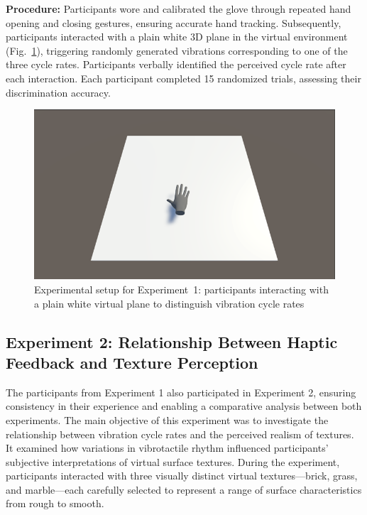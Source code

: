 \textbf{Procedure:} Participants wore and calibrated the glove through repeated hand opening and closing gestures, ensuring accurate hand tracking. Subsequently, participants interacted with a plain white 3D plane in the virtual environment (Fig.~\ref{fig:experiment1_setup}), triggering randomly generated vibrations corresponding to one of the three cycle rates. Participants verbally identified the perceived cycle rate after each interaction. Each participant completed 15 randomized trials, assessing their discrimination accuracy.

\begin{figure}[H]\centering
	\includegraphics[width=1\textwidth]{Pictures/ex1.png}%
	\caption{Experimental setup for Experiment~1: participants interacting with a plain white virtual plane to distinguish vibration cycle rates}\label{fig:experiment1_setup}%
	
\end{figure}

\newpage
\subsection{Experiment 2: Relationship Between Haptic Feedback and Texture Perception}
The participants from Experiment 1 also participated in Experiment 2, ensuring consistency in their experience and enabling a comparative analysis between both experiments. The main objective of this experiment was to investigate the relationship between vibration cycle rates and the perceived realism of textures. It examined how variations in vibrotactile rhythm influenced participants’ subjective interpretations of virtual surface textures. During the experiment, participants interacted with three visually distinct virtual textures—brick, grass, and marble—each carefully selected to represent a range of surface characteristics from rough to smooth.

